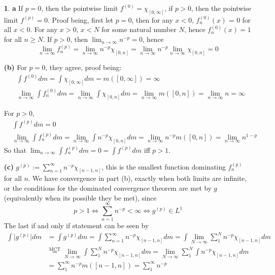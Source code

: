 \documentclass[10.5pt]{article}
\theoremstyle{definition}
\newtheorem{pb}{}
\newcommand{\abs}[1]{\lvert#1\rvert}
\begin{document}
\begin{pb}
    \textbf{a} If \(p = 0\), then the pointwise limit \(f^{(0)} = \chi_[0,\infty]\), if \(p > 0\), then the pointwise limit \(f^{(p)} = 0\). Proof being, first
    let \(p = 0\), then for any \(x < 0\), \(f^{(0)}_n(x)\) = 0 for all \(x < 0\). For any \(x > 0\), \(x < N\) for some natural number \(N\), hence
    \(f^{(0)}_n(x) = 1\) for all \(n \geq N\). If \(p > 0\), then \(\lim_{n\to\infty}n^{-p} = 0\), 
    hence \[\lim_{n\to\infty}f^{(p)}_n = \lim_{n\to\infty}n^{-p}\chi_{[0,n]} = \lim_{n\to\infty}n^{-p}\lim_{n\to\infty}\chi_{[0,n]} = 0\]

    \textbf{(b)} For \(p = 0\), they agree, proof being:
    \begin{align*}
        &\int f^{(0)}dm = \int \chi_{[0,\infty]}dm = m([0,\infty]) = \infty \\
        &\lim_{n\to\infty}\int f^{(0)}_n dm = \lim_{n\to\infty}\int \chi_[0,n]dm = \lim_{n\to\infty} m([0,n]) = \lim_{n\to\infty} n = \infty
    \end{align*}

    For \(p > 0\),
    \begin{align*}
        &\int f^{(p)}dm = 0 \\
        &\lim_{n\to\infty}\int f^{(p)}_n dm = \lim_{n\to\infty}\int n^{-p}\chi_[0,n]dm = \lim_{n\to\infty} n^{-p}m([0,n]) = \lim_{n\to\infty} n^{1-p}
    \end{align*}
    So that \(\lim_{n\to\infty}\int f^{(p)}_n dm = 0 = \int f^{(p)}dm\) iff \(p > 1\).

    \textbf{(c)} \(g^{(p)} := \sum_{n=1}^\infty n^{-p}\chi_{[n-1,n]}\), this is the smallest function dominating \(f^{(p)}_n\) for all \(n\). 
    We have convergence in part (b), exactly when both limits are infinite, or the
    conditions for the dominated convergence theorem are met by \(g\) (equivalently when its possible they be met), since 
    \[p > 1 \iff \sum_{n=1}^\infty n^{-p} < \infty \iff g^{(p)} \in L^1\]
    The last if and only if statement can be seen by
    \begin{align*}
        \int \abs{g^{(p)}} dm &= \int g^{(p)}dm = \int \sum_{n=1}^\infty n^{-p}\chi_{[n-1,n]} dm = \int \lim_{N\to\infty}\sum_1^N n^{-p}\chi_{[n-1,n]} dm \\
        &\overset{\text{MCT}}{=} \lim_{N\to\infty} \int \sum_1^N n^{-p}\chi_{[n-1,n]} dm = \lim_{N\to\infty} \sum_1^N \int n^{-p}\chi_{[n-1,n]} dm \\
        &= \sum_1^\infty n^{-p} m([n-1,n]) = \sum_1^\infty n^{-p}
    \end{align*}
\end{pb}
\end{document}
